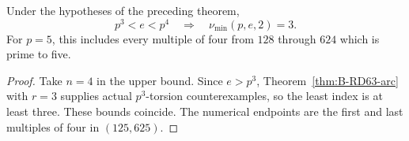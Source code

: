 \begin{corollary}
\label{cor:B-RD74-third-index}
Under the hypotheses of the preceding theorem,
\[
 p^3<e<p^4\quad\Longrightarrow\quad
 \boxed{\nu_{\min}(p,e,2)=3}.
 \tag{B-RD74.10}
\]
For \(p=5\), this includes every multiple of four from
\(128\) through \(624\) which is prime to five.
\end{corollary}
\begin{proof}
Take \(n=4\) in the upper bound. Since \(e>p^3\),
Theorem~\ref{thm:B-RD63-arc} with \(r=3\) supplies actual
\(p^3\)-torsion counterexamples, so the least index is at
least three. These bounds coincide. The numerical endpoints
are the first and last multiples of four in \((125,625)\).
\end{proof}

